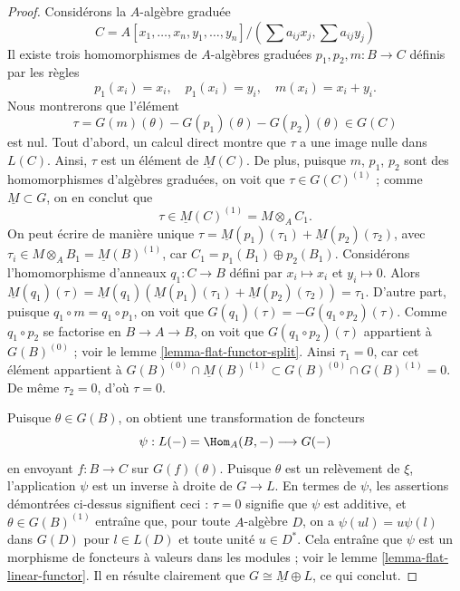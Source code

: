 \begin{proof}
\medskip\noindent
Considérons la $A$-algèbre graduée
$$
C = A[x_1, \ldots, x_n, y_1, \ldots, y_n]/
(\sum a_{ij}x_j, \sum a_{ij}y_j)
$$
Il existe trois homomorphismes de $A$-algèbres graduées $p_1, p_2, m : B \to C$
définis par les règles
$$
p_1(x_i) = x_i, \quad
p_1(x_i) = y_i, \quad
m(x_i) = x_i + y_i.
$$
Nous montrerons que l'élément
$$
\tau = G(m)(\theta) - G(p_1)(\theta) - G(p_2)(\theta) \in G(C)
$$
est nul. Tout d'abord, un calcul direct montre que $\tau$ a une image nulle dans $L(C)$.
Ainsi, $\tau$ est un élément de $\underline{M}(C)$.
De plus, puisque $m$, $p_1$, $p_2$ sont des homomorphismes d'algèbres graduées,
on voit que $\tau \in G(C)^{(1)}$ ; comme $\underline{M} \subset G$,
on en conclut que
$$
\tau \in \underline{M}(C)^{(1)} = M \otimes_A C_1.
$$
On peut écrire de manière unique
$\tau = \underline{M}(p_1)(\tau_1) + \underline{M}(p_2)(\tau_2)$, avec
$\tau_i \in M \otimes_A B_1 = \underline{M}(B)^{(1)}$, car
$C_1 = p_1(B_1) \oplus p_2(B_1)$.
Considérons l'homomorphisme d'anneaux $q_1 : C \to B$ défini par $x_i \mapsto x_i$ et
$y_i \mapsto 0$. Alors
$\underline{M}(q_1)(\tau) =
\underline{M}(q_1)(\underline{M}(p_1)(\tau_1) + \underline{M}(p_2)(\tau_2)) =
\tau_1$.
D'autre part, puisque
$q_1 \circ m = q_1 \circ p_1$, on voit que
$G(q_1)(\tau) = - G(q_1 \circ p_2)(\tau)$. Comme $q_1 \circ p_2$ se factorise en
$B \to A \to B$, on voit que $G(q_1 \circ p_2)(\tau)$ appartient à
$G(B)^{(0)}$ ; voir le
lemme \ref{lemma-flat-functor-split}.
Ainsi $\tau_1 = 0$, car cet élément appartient à
$G(B)^{(0)} \cap \underline{M}(B)^{(1)} \subset
G(B)^{(0)} \cap G(B)^{(1)} = 0$.
De même $\tau_2 = 0$, d'où $\tau = 0$.

\medskip\noindent
Puisque $\theta \in G(B)$, on obtient une transformation de foncteurs
$$
\psi : L(-) = \Hom_A(B, - ) \longrightarrow G(-)
$$
en envoyant $f : B \to C$ sur $G(f)(\theta)$. Puisque $\theta$ est un relèvement de
$\xi$, l'application $\psi$ est un inverse à droite de $G \to L$. En termes de
$\psi$, les assertions démontrées ci-dessus signifient ceci :
$\tau = 0$ signifie que $\psi$ est additive, et
$\theta \in G(B)^{(1)}$ entraîne que, pour toute $A$-algèbre $D$, on a
$\psi(ul) = u\psi(l)$ dans $G(D)$ pour $l \in L(D)$ et toute unité $u \in D^*$.
Cela entraîne que $\psi$ est un morphisme de foncteurs à valeurs dans les modules ; voir le
lemme \ref{lemma-flat-linear-functor}.
Il en résulte clairement que $G \cong \underline{M} \oplus L$, ce qui conclut.
\end{proof}

